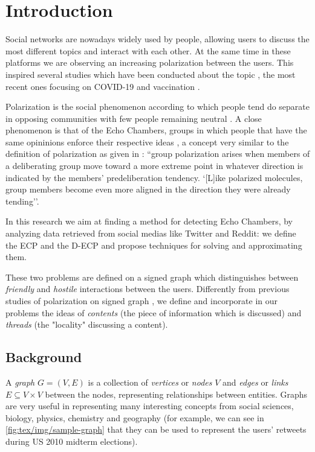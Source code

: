 \chapter{Introduction}
\label{ch:introduction}

Social networks are nowadays widely used by people, allowing users to
discuss the most different topics and interact with each other. At the same time in these
platforms we are observing an increasing polarization between the users.
This inspired several studies which have been conducted about the topic
\cite{Garimella2018,Guerra2013,conover2011political,gruzd2014investigating},
the most recent ones focusing on COVID-19
\cite{Jiang2021,green2020elusive,jiang2020political,lang2021maskon}
and vaccination \cite{Cossard2020}.

Polarization is the social phenomenon according to which people tend do
separate in opposing communities with few people remaining neutral
\cite{Guerra2013}. A close phenomenon is that of the Echo Chambers, groups in
which people that have the same opininions enforce their respective ideas
\cite{Garimella2018}, a concept very similar to the definition of polarization
as given in \cite{sunstein1999law}: ``group polarization arises when members of
a deliberating group move toward a more extreme point in whatever direction is
indicated by the members' predeliberation  tendency. `[L]ike polarized
molecules, group members become even more aligned in the direction they were
already tending''\cite{turner1987rediscovering}.

In this research we aim at finding a method for detecting Echo Chambers, by
analyzing data retrieved from social medias like Twitter and Reddit: we define
the \acrfull{ECP} and the \acrfull{D-ECP} and propose techniques for solving
and approximating them.

These two problems are defined on a signed graph which distinguishes
between \emph{friendly} and \emph{hostile} interactions between the users.
Differently from previous studies of polarization on signed graph
\cite{xiao2020searching}, we define
and incorporate in our problems the ideas of \emph{contents} (the piece of
information which is discussed) and \emph{threads} (the "locality"
discussing a content).

\section{Background}
\label{sec:background}

A \emph{graph} $G = (V, E)$ is a collection of \emph{vertices} or \emph{nodes} $V$ and
\emph{edges} or \emph{links} $E \subseteq V \times V$ between the nodes, representing relationships
between entities. Graphs are very useful in
representing many interesting concepts from social sciences, biology, physics,
chemistry and geography (for example, we can see in
\autoref{fig:tex/img/sample-graph} that they
can be used to represent the users' retweets during US 2010 midterm
elections)\cite{Newman2018,Menczer2020}.

